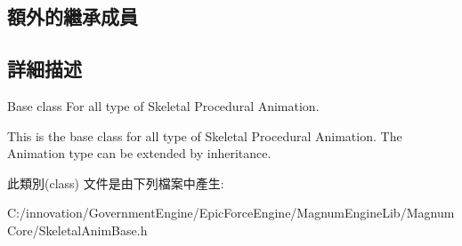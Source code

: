 \subsection*{額外的繼承成員}


\subsection{詳細描述}
Base class For all type of Skeletal Procedural Animation. 

This is the base class for all type of Skeletal Procedural Animation. The Animation type can be extended by inheritance. 

此類別(class) 文件是由下列檔案中產生\+:\begin{DoxyCompactItemize}
\item 
C\+:/innovation/\+Government\+Engine/\+Epic\+Force\+Engine/\+Magnum\+Engine\+Lib/\+Magnum\+Core/Skeletal\+Anim\+Base.\+h\end{DoxyCompactItemize}
